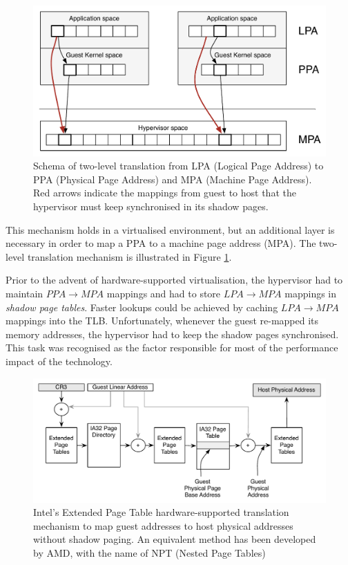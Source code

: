 \begin{figure}[htbp] 
\begin{center}
\includegraphics[scale=0.6]{images/shadow.pdf}
\caption{{Schema of two-level translation from LPA (Logical Page Address) to PPA (Physical Page Address) and MPA (Machine Page Address).  Red arrows indicate the mappings from guest to host that the hypervisor must keep synchronised in its shadow pages.}}
\label{shadow}
\end{center}
\end{figure}



This mechanism holds in a virtualised environment, but an additional layer is necessary in order to map a PPA to a machine page address (MPA). The two-level translation mechanism is illustrated in Figure \ref{shadow}.%


Prior to the advent of hardware-supported virtualisation, the hypervisor had to maintain $PPA \rightarrow MPA$ mappings and had to store $LPA \rightarrow MPA$ mappings in \emph{shadow page tables}. Faster lookups could be achieved by caching $LPA \rightarrow MPA$ mappings into the TLB. Unfortunately, whenever the guest re-mapped its memory addresses, the hypervisor had to keep the shadow pages synchronised. This task was recognised as the factor responsible for most of the performance impact of the technology.%



\begin{figure}[htbp] 
\begin{center}
\includegraphics[scale=0.6]{images/EPT.pdf}
\caption{{Intel's Extended Page Table hardware-supported translation mechanism to map guest addresses to host physical addresses without shadow paging. An equivalent method has been developed by AMD, with the name of NPT (Nested Page Tables)}}
\label{EPT}
\end{center}
\end{figure}



